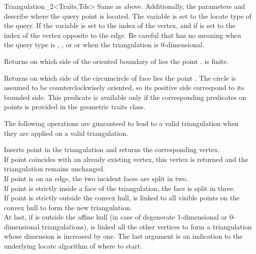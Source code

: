 \begin{ccRefClass}{Triangulation_2<Traits,Tds>}
{Same as above. Additionally, the parameters 
 and 
describe where the query point is located. 
The variable  is set to the locate type of the query.
If  
the variable 
is set to the index of the vertex, and if 
is set to the index 
of the vertex opposite to the
edge. 
Be careful that 
has no meaning when the query type is , , 
or  or when the
triangulation is $0$-dimensional.}

{Returns on which side of the oriented boundary of  lies 
the point . \ccPrecond {} is finite.}

{Returns on which side of the circumcircle  of face  lies 
the point . The circle is assumed to be counterclockwisely
oriented, so its positive
side correspond to its bounded side.
This predicate is available only if the corresponding predicates on
points is provided in the geometric traits class.}


The following operations are guaranteed to lead to a valid triangulation 
when they are applied on a valid triangulation.




{Inserts point  in the triangulation and returns the corresponding
 vertex.\\
If point  coincides with an already existing vertex, this 
vertex is returned and the triangulation remains unchanged.\\
If point  is on an edge, the two incident faces are split 
in two.\\
If point  is strictly inside a face of the triangulation,
the face is split in three.\\
If point  is strictly outside the  convex hull,  is linked
to all visible points on the convex hull to form the new
triangulation.\\
At last, if  is outside the affine hull (in case of degenerate
1-dimensional or 0-dimensional triangulations), 
is linked all the  other vertices to form a triangulation whose
dimension is increased by one.
The last argument  is an indication to the underlying locate
algorithm of where to start.
}



\end{ccRefClass}
